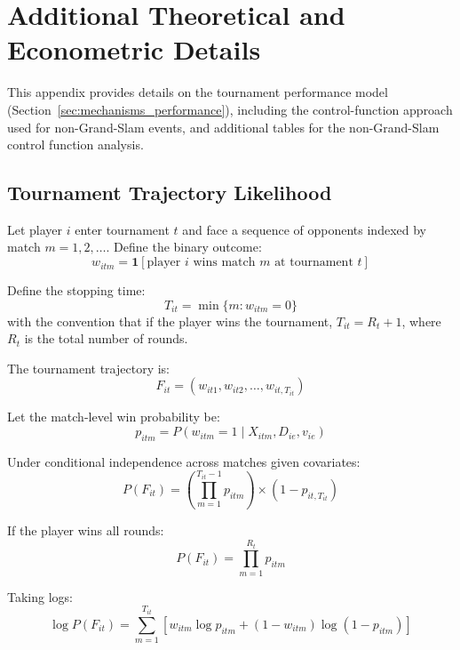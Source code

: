 \section{Additional Theoretical and Econometric Details}
\label{app:details}

This appendix provides details on the tournament performance model (Section~\ref{sec:mechanisms_performance}), including the control-function approach used for non-Grand-Slam events, and additional tables for the non-Grand-Slam control function analysis.

\subsection{Tournament Trajectory Likelihood}
\label{app:trajectory_likelihood}

Let player $i$ enter tournament $t$ and face a sequence of opponents indexed by match $m = 1,2,\dots$. Define the binary outcome:
\begin{equation}
w_{itm} = \mathbf{1}[\text{player $i$ wins match $m$ at tournament $t$}]
\end{equation}

Define the stopping time:
\begin{equation}
T_{it} = \min \{ m : w_{itm} = 0 \}
\end{equation}
with the convention that if the player wins the tournament, $T_{it} = R_t + 1$, where $R_t$ is the total number of rounds.

The tournament trajectory is:
\begin{equation}
F_{it} = (w_{it1}, w_{it2}, \dots, w_{it,T_{it}})
\end{equation}

Let the match-level win probability be:
\begin{equation}
p_{itm} = P(w_{itm} = 1 \mid X_{itm}, D_{ie}, v_{ie})
\end{equation}

Under conditional independence across matches given covariates:
\begin{equation}
P(F_{it}) =
\left( \prod_{m=1}^{T_{it}-1} p_{itm} \right)
\times (1 - p_{it,T_{it}})
\end{equation}

If the player wins all rounds:
\begin{equation}
P(F_{it}) = \prod_{m=1}^{R_t} p_{itm}
\end{equation}

Taking logs:
\begin{equation}
\log P(F_{it}) =
\sum_{m=1}^{T_{it}} \left[
w_{itm} \log p_{itm} + (1 - w_{itm}) \log(1 - p_{itm})
\right]
\end{equation}


